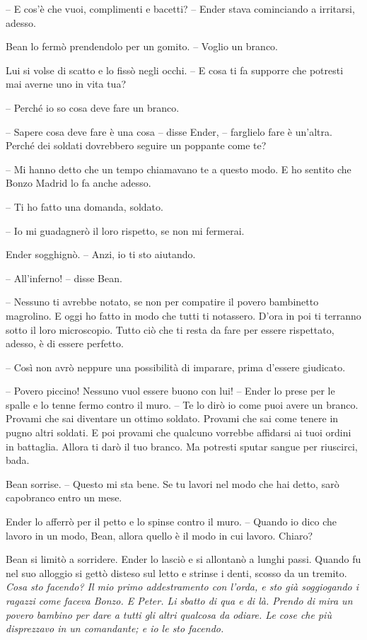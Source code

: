 {-- E cos'è che vuoi, complimenti e bacetti? -- Ender stava cominciando
	a irritarsi, adesso.}

{Bean lo fermò prendendolo per un gomito. -- Voglio un branco.}

{Lui si volse di scatto e lo fissò negli occhi. -- E cosa ti fa supporre
	che potresti mai averne uno in vita tua?}

{-- Perché io so cosa deve fare un branco.}

{-- Sapere cosa deve fare è una cosa -- disse Ender, -- farglielo fare è
	un'altra. Perché dei soldati dovrebbero seguire un poppante come te?}

{-- Mi hanno detto che un tempo chiamavano te a questo modo. E ho
	sentito che Bonzo Madrid lo fa anche adesso.}

{-- Ti ho fatto una domanda, soldato.}

{-- Io mi guadagnerò il loro rispetto, se non mi fermerai.}

{Ender sogghignò. -- Anzi, io ti sto aiutando.}

{-- All'inferno! -- disse Bean.}

{-- Nessuno ti avrebbe notato, se non per compatire il povero bambinetto
	magrolino. E oggi ho fatto in modo che tutti ti notassero. D'ora in poi
	ti terranno sotto il loro microscopio. Tutto ciò che ti resta da fare
	per essere rispettato, adesso, è di essere perfetto.}

{-- Così non avrò neppure una possibilità di imparare, prima d'essere
	giudicato.}

{-- Povero piccino! Nessuno vuol essere buono con lui! -- Ender lo prese
	per le spalle e lo tenne fermo contro il muro. -- Te lo dirò io come
	puoi avere un branco. Provami che sai diventare un ottimo soldato.
	Provami che sai come tenere in pugno altri soldati. E poi provami che
	qualcuno vorrebbe affidarsi ai tuoi ordini in battaglia. Allora ti darò
	il tuo branco. Ma potresti sputar sangue per riuscirci, bada.}

{Bean sorrise. -- Questo mi sta bene. Se tu lavori nel modo che hai
	detto, sarò capobranco entro un mese.}

{Ender lo afferrò per il petto e lo spinse contro il muro. -- Quando io
	dico che lavoro in un modo, Bean, allora quello è il modo in cui lavoro.
	Chiaro?}

{Bean si limitò a sorridere. Ender lo lasciò e si allontanò a lunghi
	passi. Quando fu nel suo alloggio si gettò disteso sul letto e strinse i
	denti, scosso da un tremito. \emph{Cosa sto facendo? Il mio primo
		addestramento con l'orda, e sto già soggiogando i ragazzi come faceva
		Bonzo. E Peter. Li sbatto di qua e di là. Prendo di mira un povero
		bambino per dare a tutti gli altri qualcosa da odiare. Le cose che più
		disprezzavo in un comandante; e io le sto facendo.}}

